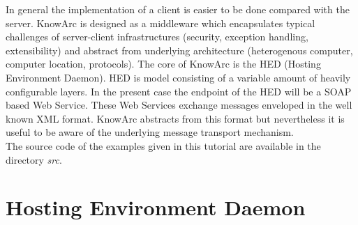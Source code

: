 In general the implementation of a client is easier to be done compared with the server. 
KnowArc is designed as a middleware which encapsulates typical challenges of server-client infrastructures (security, exception handling, extensibility) and abstract from underlying architecture (heterogenous computer, computer location, protocols).
The core of KnowArc is the HED (Hosting Environment Daemon). HED is model consisting of a variable amount of heavily configurable layers. 
%
In the present case the endpoint of the HED will be a SOAP based Web Service. These Web Services exchange messages enveloped in the well known XML format. KnowArc abstracts from this format but nevertheless it is useful to be aware of the underlying message transport mechanism.\\


The source code of the examples given in this tutorial are available in the directory \textit{src}.




\section{Hosting Environment Daemon}

